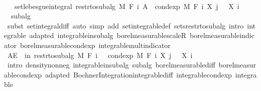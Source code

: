 \begin{isabellebody}
\ \ \ \ \ \ \isamarkupfalse%
\ \isamarkupfalse%
\ {\isachardoublequoteopen}{}\ {\isasymle}\ set{\isacharunderscore}{\kern0pt}lebesgue{\isacharunderscore}{\kern0pt}integral\ {\isacharparenleft}{\kern0pt}restr{\isacharunderscore}{\kern0pt}to{\isacharunderscore}{\kern0pt}subalg\ M\ {\isacharparenleft}{\kern0pt}F\ i{\isacharparenright}{\kern0pt}{\isacharparenright}{\kern0pt}\ A\ {\isacharparenleft}{\kern0pt}{\isasymlambda}{\isasymxi}{\isachardot}{\kern0pt}\ cond{\isacharunderscore}{\kern0pt}exp\ M\ {\isacharparenleft}{\kern0pt}F\ i{\isacharparenright}{\kern0pt}\ {\isacharparenleft}{\kern0pt}X\ j{\isacharparenright}{\kern0pt}\ {\isasymxi}\ {\isacharminus}{\kern0pt}\ X\ i\ {\isasymxi}{\isacharparenright}{\kern0pt}{\isachardoublequoteclose}\ \isamarkupfalse%
\ {\isacharasterisk}{\kern0pt}\ subalg\ \isamarkupfalse%
\ {\isacharparenleft}{\kern0pt}subst\ set{\isacharunderscore}{\kern0pt}integral{\isacharunderscore}{\kern0pt}diff{\isacharcomma}{\kern0pt}\ auto\ simp\ add{\isacharcolon}{\kern0pt}\ set{\isacharunderscore}{\kern0pt}integrable{\isacharunderscore}{\kern0pt}def\ sets{\isacharunderscore}{\kern0pt}restr{\isacharunderscore}{\kern0pt}to{\isacharunderscore}{\kern0pt}subalg\ intro{\isacharbang}{\kern0pt}{\isacharcolon}{\kern0pt}\ integrable\ adapted\ integrable{\isacharunderscore}{\kern0pt}in{\isacharunderscore}{\kern0pt}subalg\ borel{\isacharunderscore}{\kern0pt}measurable{\isacharunderscore}{\kern0pt}scaleR\ borel{\isacharunderscore}{\kern0pt}measurable{\isacharunderscore}{\kern0pt}indicator\ borel{\isacharunderscore}{\kern0pt}measurable{\isacharunderscore}{\kern0pt}cond{\isacharunderscore}{\kern0pt}exp\ integrable{\isacharunderscore}{\kern0pt}mult{\isacharunderscore}{\kern0pt}indicator{\isacharparenright}{\kern0pt}\isanewline
\ \ \ \ \isacommand{{\isacharbraceright}{\kern0pt}}\isamarkupfalse%
\isanewline
\ \ \ \ \isamarkupfalse%
\ {\isachardoublequoteopen}AE\ {\isasymxi}\ in\ restr{\isacharunderscore}{\kern0pt}to{\isacharunderscore}{\kern0pt}subalg\ M\ {\isacharparenleft}{\kern0pt}F\ i{\isacharparenright}{\kern0pt}{\isachardot}{\kern0pt}\ {}\ {\isasymle}\ cond{\isacharunderscore}{\kern0pt}exp\ M\ {\isacharparenleft}{\kern0pt}F\ i{\isacharparenright}{\kern0pt}\ {\isacharparenleft}{\kern0pt}X\ j{\isacharparenright}{\kern0pt}\ {\isasymxi}\ {\isacharminus}{\kern0pt}\ X\ i\ {\isasymxi}{\isachardoublequoteclose}\ \isamarkupfalse%
\ {\isacharparenleft}{\kern0pt}intro\ density{\isacharunderscore}{\kern0pt}nonneg\ integrable{\isacharunderscore}{\kern0pt}in{\isacharunderscore}{\kern0pt}subalg\ subalg\ borel{\isacharunderscore}{\kern0pt}measurable{\isacharunderscore}{\kern0pt}diff\ borel{\isacharunderscore}{\kern0pt}measurable{\isacharunderscore}{\kern0pt}cond{\isacharunderscore}{\kern0pt}exp\ adapted\ Bochner{\isacharunderscore}{\kern0pt}Integration{\isachardot}{\kern0pt}integrable{\isacharunderscore}{\kern0pt}diff\ integrable{\isacharunderscore}{\kern0pt}cond{\isacharunderscore}{\kern0pt}exp\ integrable{\isacharparenright}{\kern0pt}\isanewline

\end{isabellebody}
